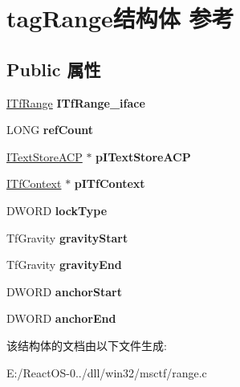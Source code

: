 \hypertarget{structtag_range}{}\section{tag\+Range结构体 参考}
\label{structtag_range}
\subsection*{Public 属性}
\begin{DoxyCompactItemize}
\item 
\mbox{\label{structtag_range_a5eeaf73823fe18410beba28591cc35c8}} 
\hyperlink{interface_i_tf_range}{I\+Tf\+Range} {\bfseries I\+Tf\+Range\+\_\+iface}
\item 
\mbox{\label{structtag_range_ab1d7c50de65f7dd5157b131fd0cab97e}} 
L\+O\+NG {\bfseries ref\+Count}
\item 
\mbox{\label{structtag_range_a042eb54d33c0e0a632e6c11e20df2c9a}} 
\hyperlink{interface_i_text_store_a_c_p}{I\+Text\+Store\+A\+CP} $\ast$ {\bfseries p\+I\+Text\+Store\+A\+CP}
\item 
\mbox{\label{structtag_range_a0882f23cc1c1a76912cfee200a9e4bd8}} 
\hyperlink{interface_i_tf_context}{I\+Tf\+Context} $\ast$ {\bfseries p\+I\+Tf\+Context}
\item 
\mbox{\label{structtag_range_a41133d20cd7dd02251c62f6590ecbdce}} 
D\+W\+O\+RD {\bfseries lock\+Type}
\item 
\mbox{\label{structtag_range_aa000b5136fb44e5f118e6e5544b8cf9d}} 
Tf\+Gravity {\bfseries gravity\+Start}
\item 
\mbox{\label{structtag_range_a055193bf18aaf0b93ac794da6887bf08}} 
Tf\+Gravity {\bfseries gravity\+End}
\item 
\mbox{\label{structtag_range_afae516d6e6e940ffbfab53ad03a67295}} 
D\+W\+O\+RD {\bfseries anchor\+Start}
\item 
\mbox{\label{structtag_range_a172862e55e32743cd5ebbc02c551726a}} 
D\+W\+O\+RD {\bfseries anchor\+End}
\end{DoxyCompactItemize}


该结构体的文档由以下文件生成\+:\begin{DoxyCompactItemize}
\item 
E\+:/\+React\+O\+S-\/0../dll/win32/msctf/range.\+c\end{DoxyCompactItemize}
